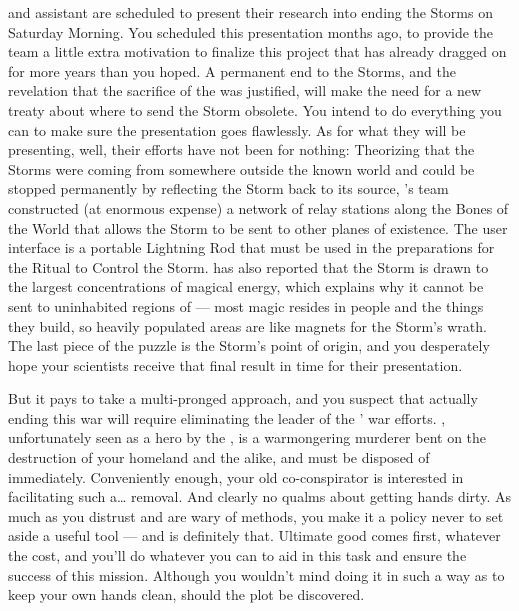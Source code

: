\documentclass[char]{GL2020}
\begin{document}
 \cHeadScientist{\full} and \cHeadScientist{\their} assistant \cAssistantScientist{\intro} are scheduled to present their research into ending the Storms on Saturday Morning. You scheduled this presentation months ago, to provide the team a little extra motivation to finalize this project that has already dragged on for more years than you hoped. A permanent end to the Storms, and the revelation that the sacrifice of the \pShip{} was justified, will make the need for a new treaty about where to send the Storm obsolete. You intend to do everything you can to make sure the presentation goes flawlessly. As for what they will be presenting, well, their efforts have not been for nothing: Theorizing that the Storms were coming from somewhere outside the known world and could be stopped permanently by reflecting the Storm back to its source, \cHeadScientist{}’s team constructed (at enormous expense) a network of relay stations along the Bones of the World that allows the Storm to be sent to other planes of existence. The user interface is a portable Lightning Rod that must be used in the preparations for the Ritual to Control the Storm. \cHeadScientist{} has also reported that the Storm is drawn to the largest concentrations of magical energy, which explains why it cannot be sent to uninhabited regions of \pEarth{} — most magic resides in people and the things they build, so heavily populated areas are like magnets for the Storm’s wrath. The last piece of the puzzle is the Storm’s point of origin, and you desperately hope your scientists receive that final result in time for their presentation.

But it pays to take a multi-pronged approach, and you suspect that actually ending this war will require eliminating the leader of the \pShip{}’ war efforts. \cLoud{\intro}, unfortunately seen as a hero by the \pShippies{}, is a warmongering murderer bent on the destruction of your homeland and the \pFarm{} alike, and must be disposed of immediately. Conveniently enough, your old co-conspirator \cEvil{} is interested in facilitating such a\ldots{} removal. And \cEvil{\they} clearly \cEvil{\have} no qualms about getting \cEvil{\their} hands dirty. As much as you distrust \cEvil{} and are wary of \cEvil{\their} methods, you make it a policy never to set aside a useful tool — and \cEvil{} is definitely that. Ultimate good comes first, whatever the cost, and you'll do whatever you can to aid \cEvil{} in this task and ensure the success of this mission. Although you wouldn't mind doing it in such a way as to keep your own hands clean, should the plot be discovered.
\end{document}
